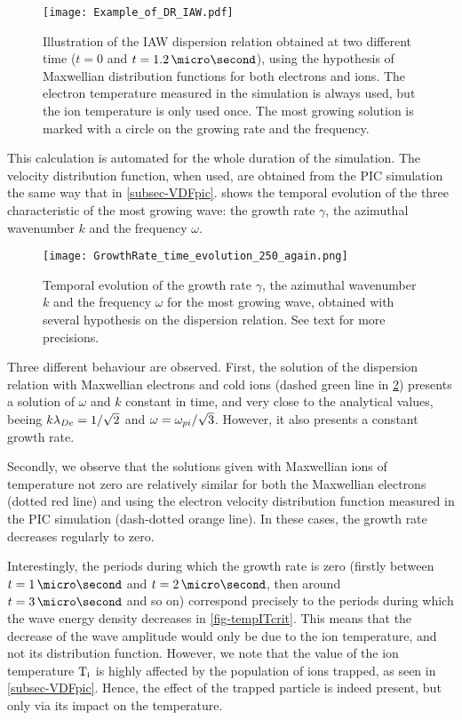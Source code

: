   \begin{figure}[hbtp]
    \centering
    \texttt{[image: Example\_of\_DR\_IAW.pdf]}
    \caption{Illustration of the \ac{IAW} dispersion relation obtained at two different time ($t=0$ and $t=1.2\,\micro\second$), using the hypothesis of Maxwellian distribution functions for both electrons and ions. The electron temperature measured in the simulation is always used, but the ion temperature is only used once. The most growing solution is marked with a circle on the growing rate and the frequency.}
    \label{fig-Example_of_DR_IAW}
  \end{figure}
  
  
  This calculation is automated for the whole duration of the simulation.
  The velocity distribution function, when used, are obtained from the \ac{PIC} simulation the same way that in \cref{subsec-VDFpic}.
   shows the temporal evolution of the three characteristic of the most growing wave: the growth rate $\gamma$, the azimuthal wavenumber $k$ and the frequency $\omega$.
  \begin{figure}[hbtp]
    \centering
    \texttt{[image: GrowthRate\_time\_evolution\_250\_again.png]}  %
    \caption{Temporal evolution of the growth rate $\gamma$, the azimuthal wavenumber $k$ and the frequency $\omega$ for the most growing wave, obtained with several hypothesis on the dispersion relation. See text for more precisions. }
    \label{fig-time_wave}
  \end{figure}
  
  Three different behaviour are observed.
  First, the solution of the dispersion relation with Maxwellian electrons and cold ions (dashed green line in \cref{fig-time_wave}) presents a solution of $\omega$ and $k$ constant in time, and very close to the analytical values, beeing $k \lambda_{De} = 1/\sqrt{2}$ and $\omega = \omega_{pi}/\sqrt{3}$.
  However, it also presents a constant growth rate.
  
  Secondly, we observe that the solutions given with Maxwellian ions of temperature not zero are relatively similar for both the Maxwellian electrons  (dotted red line) and using the electron velocity distribution function measured in the \ac{PIC} simulation (dash-dotted orange line).
  In these cases, the growth rate decreases regularly to zero.
  
  Interestingly, the periods during which the growth rate is zero (firstly between $t=1\,\micro\second$ and $t=2\,\micro\second$, then around $t=3\,\micro\second$ and so on) correspond precisely to the periods during which the wave energy density decreases in \vref{fig-tempITcrit}.
  This means that the decrease of the wave amplitude would only be due to the ion temperature, and not its distribution function.
  However, we note that the value of the ion temperature $\mathrm{T_i}$ is highly affected by the population of ions trapped, as seen in \cref{subsec-VDFpic}.
  Hence, the effect of the trapped particle is indeed present, but only via its impact on the temperature.
  
